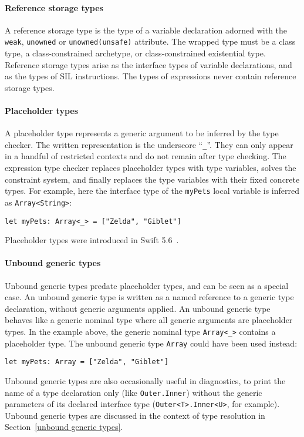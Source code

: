 \documentclass[../generics]{subfiles}
\begin{document}
\paragraph{Reference storage types}
A reference storage type is the type of a variable declaration adorned with the \texttt{weak}, \texttt{unowned} or \texttt{unowned(unsafe)} attribute. The wrapped type must be a class type, a class-constrained archetype, or class-constrained existential type. Reference storage types arise as the interface types of variable declarations, and as the types of SIL instructions. The types of expressions never contain reference storage types.

\paragraph{Placeholder types}
A placeholder type represents a generic argument to be inferred by the type checker. The written representation is the underscore ``\texttt{\_}''. They can only appear in a handful of restricted contexts and do not remain after type checking. The expression type checker replaces placeholder types with type variables, solves the constraint system, and finally replaces the type variables with their fixed concrete types. For example, here the interface type of the \texttt{myPets} local variable is inferred as \texttt{Array<String>}:
\begin{Verbatim}
let myPets: Array<_> = ["Zelda", "Giblet"]
\end{Verbatim}
Placeholder types were introduced in Swift 5.6~\cite{se0315}.

\paragraph{Unbound generic types}
Unbound generic types predate placeholder types, and can be seen as a special case. An unbound generic type is written as a named reference to a generic type declaration, without generic arguments applied. An unbound generic type behaves like a generic nominal type where all generic arguments are placeholder types. In the example above, the generic nominal type \texttt{Array<\_>} contains a placeholder type. The unbound generic type \texttt{Array} could have been used instead:
\begin{Verbatim}
let myPets: Array = ["Zelda", "Giblet"]
\end{Verbatim}
Unbound generic types are also occasionally useful in diagnostics, to print the name of a type declaration only (like \texttt{Outer.Inner}) without the generic parameters of its declared interface type (\texttt{Outer<T>.Inner<U>}, for example). Unbound generic types are discussed in the context of type resolution in Section~\ref{unbound generic types}.
\end{document}
